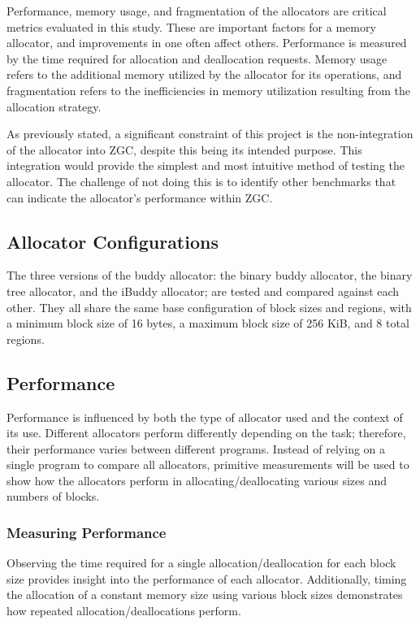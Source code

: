 Performance, memory usage, and fragmentation of the allocators are critical metrics evaluated in this study. These are important factors for a memory allocator, and improvements in one often affect others. Performance is measured by the time required for allocation and deallocation requests. Memory usage refers to the additional memory utilized by the allocator for its operations, and fragmentation refers to the inefficiencies in memory utilization resulting from the allocation strategy.

As previously stated, a significant constraint of this project is the non-integration of the allocator into ZGC, despite this being its intended purpose. This integration would provide the simplest and most intuitive method of testing the allocator. The challenge of not doing this is to identify other benchmarks that can indicate the allocator's performance within ZGC.

\subsection{Allocator Configurations}
The three versions of the buddy allocator: the binary buddy allocator, the binary tree allocator, and the iBuddy allocator; are tested and compared against each other. They all share the same base configuration of block sizes and regions, with a minimum block size of 16 bytes, a maximum block size of 256 KiB, and 8 total regions.

\subsection{Performance}
Performance is influenced by both the type of allocator used and the context of its use. Different allocators perform differently depending on the task; therefore, their performance varies between different programs. Instead of relying on a single program to compare all allocators, primitive measurements will be used to show how the allocators perform in allocating/deallocating various sizes and numbers of blocks.

\subsubsection{Measuring Performance}
Observing the time required for a single allocation/deallocation for each block size provides insight into the performance of each allocator. Additionally, timing the allocation of a constant memory size using various block sizes demonstrates how repeated allocation/deallocations perform.

